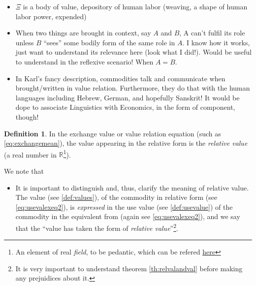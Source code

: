 \documentclass[12pt]{extarticle}
\theoremstyle{definition}
\newtheorem{definition}{Definition}[section]
\newenvironment{remark}[1][Remark]{\begin{trivlist}
\item[\hskip \labelsep {\bfseries #1}]}{\end{trivlist}}
\begin{document}
\begin{remark}
\begin{itemize}
    \item $\Xi$ is a body of value, depository of human labor (weaving, a shape of human labor power, expended)
    \item When two things are brought in context, say $A$ and $B$, A can't fulfil its role unless $B$ ``sees'' some bodily form of the same role in $A$.  I know how it works, just want to understand its relevance here (look what I did!).  Would be useful to understand in the reflexive scenario!  When $A=B$.
      \item In Karl's fancy description, commodities talk and communicate when brought/written in value relation.  Furthermore, they do that with the human languages including Hebrew, German, and hopefully Sanskrit!  It would be dope to associate Linguistics with Economics, in the form of component, though!
  \end{itemize}
\end{remark}

\begin{definition}
  \label{def:relval}
  In the exchange value or value relation equation (such as \ref{eq:exchangemean}), the value appearing in the relative form is the \emph{relative value} (a real number in $\mathbb{R}$\footnote{An element of real \emph{field}, to be pedantic, which can be refered \href{https://en.wikipedia.org/wiki/Field_(mathematics)}{here}}).
\end{definition}

\begin{remark}
  We note that
  \begin{itemize}
  \item It is important to distinguish and, thus, clarify the meaning of relative value.  The value (see \ref{def:values}), of the commodity in relative form (see \ref{eq:usevalexeq2}), is \emph{expressed} in the use value (see \ref{def:usevalue}) of the commodity in the equivalent from (again see \ref{eq:usevalexeq2}), and we say that the ``value has taken the form of \emph{relative value}''\footnote{It is very important to understand theorem \ref{th:relvalandval} before making any prejuidices about it.}.
  \end{itemize}
\end{remark}
\end{document}
